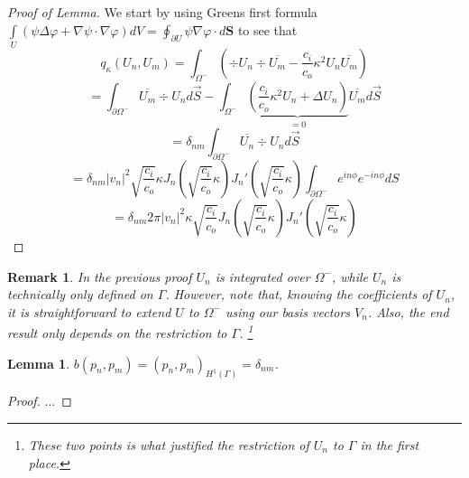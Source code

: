 \documentclass[10pt,journal,compsoc, onecolumn]{IEEEtran}
\newtheorem{lemma}[theorem]{Lemma}
\newtheorem{remark}[theorem]{Remark}
\begin{document}
\begin{proof}[Proof of Lemma]
    We start by using Greens first formula 
    \(\int\limits_{U}(\psi \Delta \varphi+\nabla \psi \cdot \nabla \varphi) d V=\oint_{\partial U} \psi \nabla \varphi \cdot d \mathbf{S}\)
    to see that $$q_\kappa(U_n, U_m) = \int_{\Omega^-} ( \div U_n \div \overline{U_m} -  \frac{c_i}{c_o}\kappa^2U_n \overline{U_m}) $$
    $$
        = \int_{ \partial \Omega^-} \overline{U_m} \div U_n d \vec{S} - \int_{\Omega^{-}} \underbrace{( \frac{c_i}{c_o}\kappa^2 U_n + \Delta U_n)}_{=0} \overline{U_m} d \vec{S} 
    $$
    $$
        = \delta_{nm}\int_{ \partial \Omega^-} \overline{U_n} \div U_n d \vec{S}
    $$
    $$
        = \delta_{nm}|v_n|^2 \sqrt{ \frac{c_i}{c_o}} \kappa  J_n(\sqrt{ \frac{c_i}{c_o}}\kappa ) J_n'(\sqrt{ \frac{c_i}{c_o}}\kappa )  \int_{\partial \Omega^-} e^{in\phi}  e^{-in\phi} dS
    $$
    $$
        = \delta_{nm}2\pi |v_n|^2\kappa \sqrt{ \frac{c_i}{c_o}} J_n(\sqrt{ \frac{c_i}{c_o}} \kappa ) J_n'(\sqrt{ \frac{c_i}{c_o}} \kappa )
    $$
\end{proof}

\begin{remark}
    In the previous proof $U_n$ is integrated over $\Omega^-$, while $U_n$ is technically only defined on $\Gamma$. 
    However, note that, knowing the coefficients of $U_n$, it is straightforward to extend $U$ to $\Omega^-$ using our basis vectors $V_n$. 
    Also, the end result only depends on the restriction to $\Gamma$.
    \footnote{These two points is what justified the restriction of $U_n$ to $\Gamma$ in the first place.}
\end{remark}

\begin{lemma}
    $b(p_n, p_m) =  (p_n, p_m)_{H^1(\Gamma)} = \delta_{nm}$.
\end{lemma}
\begin{proof}
    ...
\end{proof}
   
\end{document}
